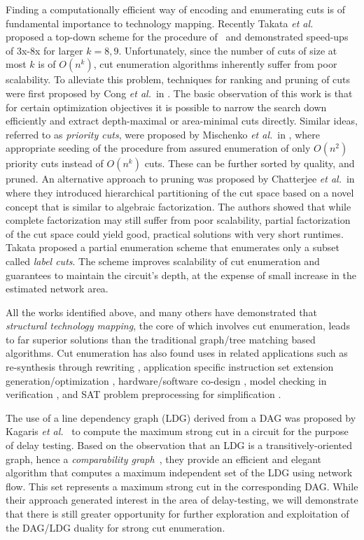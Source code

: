 \documentclass[journal]{IEEEtran}
\begin{document}
Finding a computationally efficient way of encoding and enumerating cuts is of fundamental importance to technology mapping. Recently Takata \emph{et al.\/}~\cite{takata2009efficient} proposed a top-down scheme for the procedure of~\cite{Pan1998} and demonstrated speed-ups of 3x-8x for larger $k=8,9$. Unfortunately, since the number of cuts of size at most $k$ is of $O(n^k)$, cut enumeration algorithms inherently suffer from poor scalability. To alleviate this problem, techniques for ranking and pruning of cuts were first proposed by Cong \emph{et al.}\ in \cite{Cong1999}. The basic observation of this work is that for certain optimization objectives it is possible to narrow the search down efficiently and extract depth-maximal or area-minimal cuts directly. Similar ideas, referred to as \emph{priority cuts}, were proposed by Mischenko \emph{et al.}\ in \cite{Mishchenko2007}, where appropriate seeding of the procedure from \cite{Pan1998} assured enumeration of only $O(n^2)$ priority cuts instead of $O(n^k)$ cuts.  These can be further  sorted by quality, and pruned. An alternative approach to pruning was proposed by Chatterjee \emph{et al.}\ in \cite{Chatterjee2006} where they introduced hierarchical partitioning of the cut space based on a novel concept that is similar to algebraic factorization. The authors showed that while complete factorization may still suffer from poor scalability, partial factorization of the cut space could yield good, practical solutions with very short runtimes.  Takata \cite{takata2009efficient} proposed a partial enumeration scheme that enumerates only a subset called \emph{label cuts}. The scheme improves scalability of cut enumeration and guarantees to maintain the circuit's depth, at the expense of small increase in the estimated network area. 

All the works identified above, and many others have demonstrated that \emph{structural technology mapping}, the core of which involves cut enumeration, leads to far superior solutions than the traditional graph/tree matching based algorithms. Cut enumeration has also found uses in related applications such as re-synthesis through rewriting \cite{Mishchenko2009}, application specific instruction set extension generation/optimization \cite{cong2006architecture}, hardware/software co-design \cite{peddersen2005rapid}, model checking in verification \cite{case2008cut}, and SAT problem preprocessing for simplification \cite{een2007applying}.

The use of a line dependency graph (LDG) derived from a DAG was proposed by Kagaris \emph{et al.}~\cite{kagaris1999maximum} to compute the maximum strong cut in a circuit for the purpose of delay testing. Based on the observation that an LDG is a transitively-oriented graph, hence a \emph{comparability graph}~\cite{golumbic2004algorithmic}, they provide an efficient and elegant algorithm that computes a maximum independent set of the LDG using network flow. This set represents a maximum strong cut in the corresponding DAG. While their approach generated interest in the area of delay-testing, we will demonstrate that there is still greater opportunity for further exploration and exploitation of the DAG/LDG duality for strong cut enumeration.
\end{document}
